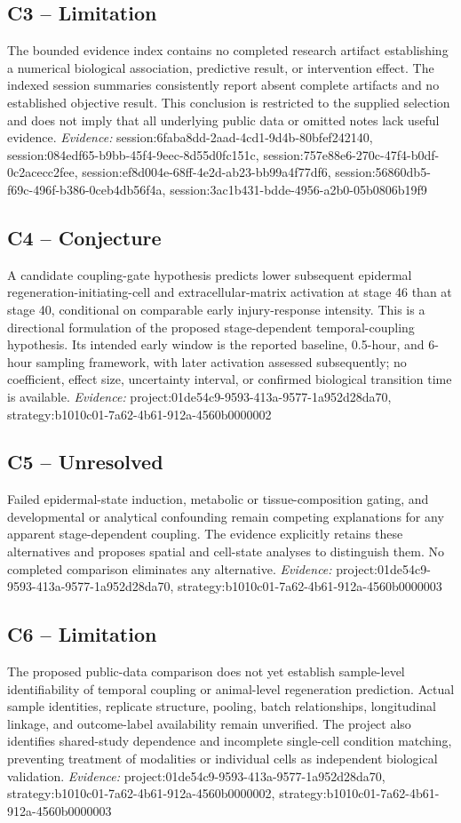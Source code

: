 \documentclass[11pt]{article}
\begin{document}
\subsection{C3 -- Limitation}
The bounded evidence index contains no completed research artifact establishing a numerical biological association, predictive result, or intervention effect.
The indexed session summaries consistently report absent complete artifacts and no established objective result. This conclusion is restricted to the supplied selection and does not imply that all underlying public data or omitted notes lack useful evidence.
\textit{Evidence: }session:6faba8dd-2aad-4cd1-9d4b-80bfef242140, session:084edf65-b9bb-45f4-9eec-8d55d0fc151c, session:757e88e6-270c-47f4-b0df-0c2acecc2fee, session:ef8d004e-68ff-4e2d-ab23-bb99a4f77df6, session:56860db5-f69c-496f-b386-0ceb4db56f4a, session:3ac1b431-bdde-4956-a2b0-05b0806b19f9
\subsection{C4 -- Conjecture}
A candidate coupling-gate hypothesis predicts lower subsequent epidermal regeneration-initiating-cell and extracellular-matrix activation at stage 46 than at stage 40, conditional on comparable early injury-response intensity.
This is a directional formulation of the proposed stage-dependent temporal-coupling hypothesis. Its intended early window is the reported baseline, 0.5-hour, and 6-hour sampling framework, with later activation assessed subsequently; no coefficient, effect size, uncertainty interval, or confirmed biological transition time is available.
\textit{Evidence: }project:01de54c9-9593-413a-9577-1a952d28da70, strategy:b1010c01-7a62-4b61-912a-4560b0000002
\subsection{C5 -- Unresolved}
Failed epidermal-state induction, metabolic or tissue-composition gating, and developmental or analytical confounding remain competing explanations for any apparent stage-dependent coupling.
The evidence explicitly retains these alternatives and proposes spatial and cell-state analyses to distinguish them. No completed comparison eliminates any alternative.
\textit{Evidence: }project:01de54c9-9593-413a-9577-1a952d28da70, strategy:b1010c01-7a62-4b61-912a-4560b0000003
\subsection{C6 -- Limitation}
The proposed public-data comparison does not yet establish sample-level identifiability of temporal coupling or animal-level regeneration prediction.
Actual sample identities, replicate structure, pooling, batch relationships, longitudinal linkage, and outcome-label availability remain unverified. The project also identifies shared-study dependence and incomplete single-cell condition matching, preventing treatment of modalities or individual cells as independent biological validation.
\textit{Evidence: }project:01de54c9-9593-413a-9577-1a952d28da70, strategy:b1010c01-7a62-4b61-912a-4560b0000002, strategy:b1010c01-7a62-4b61-912a-4560b0000003
\end{document}

